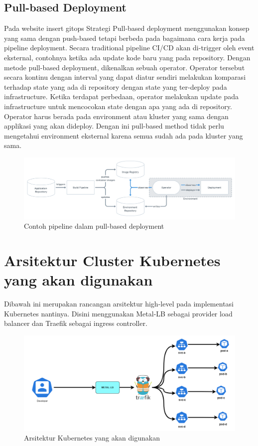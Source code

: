 \subsection{Pull-based Deployment}
Pada website insert gitops Strategi Pull-based deployment menggunakan konsep
yang sama dengan push-based tetapi berbeda pada bagaimana cara kerja pada pipeline deployment.
Secara traditional pipeline CI/CD akan di-trigger oleh event eksternal, contohnya ketika ada update kode
baru yang pada repository. Dengan metode pull-based deployment, dikenalkan sebuah operator.
Operator tersebut secara kontinu dengan interval yang dapat diatur sendiri melakukan komparasi
terhadap state yang ada di repository dengan state yang ter-deploy pada infrastructure.
Ketika terdapat perbedaan, operator melakukan update pada infrastructure untuk mencocokan state dengan apa yang ada di repository.
Operator harus berada pada environment atau kluster yang sama dengan applikasi yang akan dideploy. Dengan ini pull-based method
tidak perlu mengetahui environment eksternal karena semua sudah ada pada kluster yang sama.
\begin{figure}[h]
    \centering
    \includegraphics[width=1\textwidth]{images/pull-based.png}
    \caption{Contoh pipeline dalam pull-based deployment}
\end{figure}
\vspace{0.5cm}

\newpage
\section{Arsitektur Cluster Kubernetes yang akan digunakan}
Dibawah ini merupakan rancangan arsitektur high-level pada implementasi Kubernetes
nantinya. Disini menggunakan Metal-LB sebagai provider load  balancer dan Traefik sebagai ingress controller.
\begin{figure}[h]
    \centering
    \includegraphics[width=1\textwidth]{images/kubernetes-arch.png}
    \caption{Arsitektur Kubernetes yang akan digunakan}
\end{figure}



